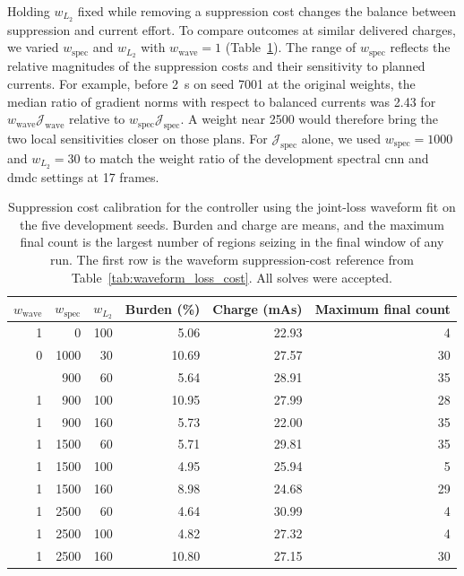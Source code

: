Holding \(w_{L_2}\) fixed while removing a suppression cost changes the balance between suppression and current effort.
To compare outcomes at similar delivered charges, we varied \(w_{\mathrm{spec}}\) and \(w_{L_2}\) with \(w_{\mathrm{wave}}=1\) (Table~\ref{tab:waveform_cost_calibration}).
The range of \(w_{\mathrm{spec}}\) reflects the relative magnitudes of the suppression costs and their sensitivity to planned currents.
For example, before \SI{2}{\second} on seed 7001 at the original weights, the median ratio of gradient norms with respect to balanced currents was 2.43 for \(w_{\mathrm{wave}}\mathcal J_{\mathrm{wave}}\) relative to \(w_{\mathrm{spec}}\mathcal J_{\mathrm{spec}}\).
A weight near 2500 would therefore bring the two local sensitivities closer on those plans.
For \(\mathcal J_{\mathrm{spec}}\) alone, we used \(w_{\mathrm{spec}}=1000\) and \(w_{L_2}=30\) to match the weight ratio of the development spectral \ac{cnn} and \ac{dmdc} settings at 17 frames.

\begin{table}
  \centering
  \caption{Suppression cost calibration for the controller using the joint-loss waveform fit on the five development seeds.
  Burden and charge are means, and the maximum final count is the largest number of regions seizing in the final window of any run.
  The first row is the waveform suppression-cost reference from Table~\ref{tab:waveform_loss_cost}.
  All solves were accepted.}\label{tab:waveform_cost_calibration}
  \begin{tabular}{@{}rrrrrr@{}}
    \toprule
    \(w_{\mathrm{wave}}\) & \(w_{\mathrm{spec}}\) & \(w_{L_2}\) & Burden (\%) & Charge (mAs) & Maximum final count \\
    \midrule
    1 & 0 & 100 & 5.06 & 22.93 & 4 \\
    0 & 1000 & 30 & 10.69 & 27.57 & 30 \\
    \addlinespace
    1 & 900 & 60 & 5.64 & 28.91 & 35 \\
    1 & 900 & 100 & 10.95 & 27.99 & 28 \\
    1 & 900 & 160 & 5.73 & 22.00 & 35 \\
    1 & 1500 & 60 & 5.71 & 29.81 & 35 \\
    1 & 1500 & 100 & 4.95 & 25.94 & 5 \\
    1 & 1500 & 160 & 8.98 & 24.68 & 29 \\
    1 & 2500 & 60 & 4.64 & 30.99 & 4 \\
    1 & 2500 & 100 & 4.82 & 27.32 & 4 \\
    1 & 2500 & 160 & 10.80 & 27.15 & 30 \\
    \bottomrule
  \end{tabular}
\end{table}

